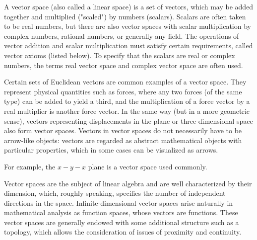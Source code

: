 \begin{mathbox}{}
{A  vector space (also called a linear space) is a set of vectors, which may be added together and multiplied ("scaled") by numbers (scalars). Scalars are often taken to be real numbers, but there are also vector spaces with scalar multiplication by complex numbers, rational numbers, or generally any field. The operations of vector addition and scalar multiplication must satisfy certain requirements, called vector axioms (listed below). To specify that the scalars are real or complex numbers, the terms real vector space and complex vector space are often used.

Certain sets of Euclidean vectors are common examples of a vector space. They represent physical quantities such as forces, where any two forces (of the same type) can be added to yield a third, and the multiplication of a force vector by a real multiplier is another force vector. In the same way (but in a more geometric sense), vectors representing displacements in the plane or three-dimensional space also form vector spaces. Vectors in vector spaces do not necessarily have to be arrow-like objects: vectors are regarded as abstract mathematical objects with particular properties, which in some cases can be visualized as arrows.

For example, the $x-y-x$ plane is a vector space used commonly.

Vector spaces are the subject of linear algebra and are well characterized by their dimension, which, roughly speaking, specifies the number of independent directions in the space. Infinite-dimensional vector spaces arise naturally in mathematical analysis as function spaces, whose vectors are functions. These vector spaces are generally endowed with some additional structure such as a topology, which allows the consideration of issues of proximity and continuity.}
\end{mathbox}

